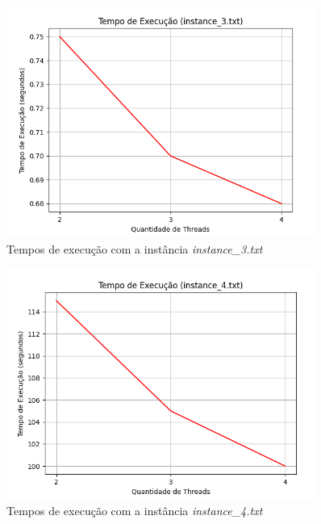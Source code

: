 \documentclass[a4paper, 12pt]{article}
\begin{document}
\begin{figure}[H]
    \centering
    \includegraphics[width=0.9\textwidth]{Images/i3.png}
    \vspace*{-0.2cm}
    \caption{Tempos de execução com a instância \emph{instance\_3.txt}}
    \label{fig:map4}
\end{figure}

\begin{figure}[H]
    \centering
    \includegraphics[width=0.9\textwidth]{Images/i4.png}
    \vspace*{-0.5cm}
    \caption{Tempos de execução com a instância \emph{instance\_4.txt}}
    \label{fig:map5}
\end{figure}
\end{document}
